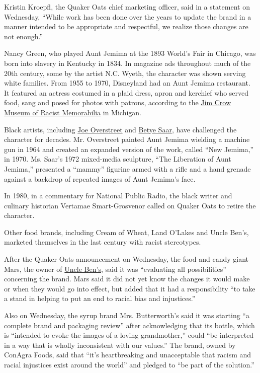 Kristin Kroepfl, the Quaker Oats chief marketing officer, said in a
statement on Wednesday, ``While work has been done over the years to
update the brand in a manner intended to be appropriate and respectful,
we realize those changes are not enough.''

Nancy Green, who played Aunt Jemima at the 1893 World's Fair in Chicago,
was born into slavery in Kentucky in 1834. In magazine ads throughout
much of the 20th century, some by the artist N.C. Wyeth, the character
was shown serving white families. From 1955 to 1970, Disneyland had an
Aunt Jemima restaurant. It featured an actress costumed in a plaid
dress, apron and kerchief who served food, sang and posed for photos
with patrons, according to the
\href{https://www.ferris.edu/HTMLS/news/jimcrow/question/2019/april_may.htm\#}{Jim
Crow Museum of Racist Memorabilia} in Michigan.

Black artists, including
\href{https://www.tate.org.uk/whats-on/tate-modern/exhibition/ey-exhibition-world-goes-pop/artist-interview/joe-overstreet}{Joe
Overstreet} and
\href{https://www.nytimes.com/video/opinion/100000006923399/betye-saar-taking-care-of-business.html}{Betye
Saar}, have challenged the character for decades. Mr. Overstreet painted
Aunt Jemima wielding a machine gun in 1964 and created an expanded
version of the work, called ``New Jemima,'' in 1970. Ms. Saar's 1972
mixed-media sculpture, ``The Liberation of Aunt Jemima,'' presented a
``mammy'' figurine armed with a rifle and a hand grenade against a
backdrop of repeated images of Aunt Jemima's face.

In 1980, in a commentary for National Public Radio, the black writer and
culinary historian Vertamae Smart-Grosvenor called on Quaker Oats to
retire the character.

Other food brands, including Cream of Wheat, Land O'Lakes and Uncle
Ben's, marketed themselves in the last century with racist stereotypes.

After the Quaker Oats announcement on Wednesday, the food and candy
giant Mars, the owner of
\href{https://www.nytimes.com/2007/03/30/business/media/30adco.html}{Uncle
Ben's}, said it was ``evaluating all possibilities'' concerning the
brand. Mars said it did not yet know the changes it would make or when
they would go into effect, but added that it had a responsibility ``to
take a stand in helping to put an end to racial bias and injustices.''

Also on Wednesday, the syrup brand Mrs. Butterworth's said it was
starting ``a complete brand and packaging review'' after acknowledging
that its bottle, which is ``intended to evoke the images of a loving
grandmother,'' could ``be interpreted in a way that is wholly
inconsistent with our values.'' The brand, owned by ConAgra Foods, said
that ``it's heartbreaking and unacceptable that racism and racial
injustices exist around the world'' and pledged to ``be part of the
solution.''

